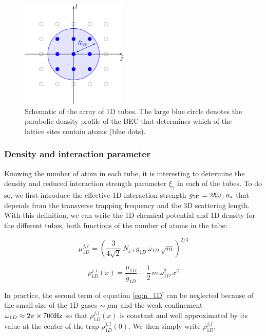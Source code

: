 \begin{figure}
    \centering
    \includegraphics[width=0.45\textwidth]{Fig/Chapter5/tubes_occupes.png}
    \caption{Schematic of the array of 1D tubes. The large blue circle denotes the parabolic density profile of the BEC that determines which of the lattice sites contain atoms (blue dots).}
    \label{fig:my_label}
\end{figure}

\subsubsection{Density and interaction parameter}


Knowing the number of atom in each tube, it is interesting to determine the density and reduced interaction strength parameter $\xi_{\gamma}$ in each of the tubes. To do so, we first introduce the effective 1D interaction strength $g_{\rm{1D}} = 2 \hbar \omega_{\perp} a_s$ \cite{olshanii1998atomic} that depends from the transverse trapping frequency and the 3D scattering length. With this definition, we can write the 1D chemical potential and 1D density for the different tubes, both functions of the number of atoms in the tube:

\begin{equation}
    \mu_{1D}^{j,l} = \left( \frac{3}{4 \sqrt{2}} \, N_{j,l}\,  g_{1D} \, \omega_{1D}\,  \sqrt{m} \right)^{2/3}
\end{equation}

\begin{equation}\label{eq:n_1D}
    \rho_{1D}^{j,l}(x) = \frac{\mu_{1D}}{g_{1D}} - \frac{1}{2} \, m \, \omega_{1D}^2 \, x^2
\end{equation}

\noindent In practice, the second term of equation \ref{eq:n_1D} can be neglected because of the small size of the 1D gases $\sim \mu \rm{m}$ and the weak confinement $\omega_{1D} \approx 2 \pi \times 700 \rm{Hz}$ so that $\rho_{1D}^{j,l}(x)$ is constant and well approximated by its value at the center of the trap $\rho_{1D}^{j,l}(0)$. We then simply write $\rho_{1D}^{j,l}$.

